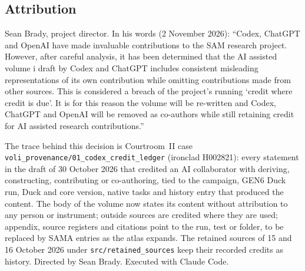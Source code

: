 \subsection*{Attribution}
\noindent\small Sean Brady, project director. In his words (2 November 2026): ``Codex, ChatGPT and OpenAI have made invaluable contributions to the SAM research project. However, after careful analysis, it has been determined that the AI assisted volume i draft by Codex and ChatGPT includes consistent misleading representations of its own contribution while omitting contributions made from other sources. This is considered a breach of the project's running `credit where credit is due'. It is for this reason the volume will be re-written and Codex, ChatGPT and OpenAI will be removed as co-authors while still retaining credit for AI assisted research contributions.''

\noindent\small The trace behind this decision is Courtroom~II case \texttt{voli\_provenance/01\_codex\_credit\_ledger} (ironclad H002821): every statement in the draft of 30 October 2026 that credited an AI collaborator with deriving, constructing, contributing or co-authoring, tied to the campaign, GEN6 Duck run, Duck and core version, native tasks and history entry that produced the content. The body of the volume now states its content without attribution to any person or instrument; outside sources are credited where they are used; appendix, source registers and citations point to the run, test or folder, to be replaced by SAMA entries as the atlas expands. The retained sources of 15 and 16 October 2026 under \texttt{src/retained\_sources} keep their recorded credits as history. Directed by Sean Brady. Executed with Claude Code.
\clearpage
